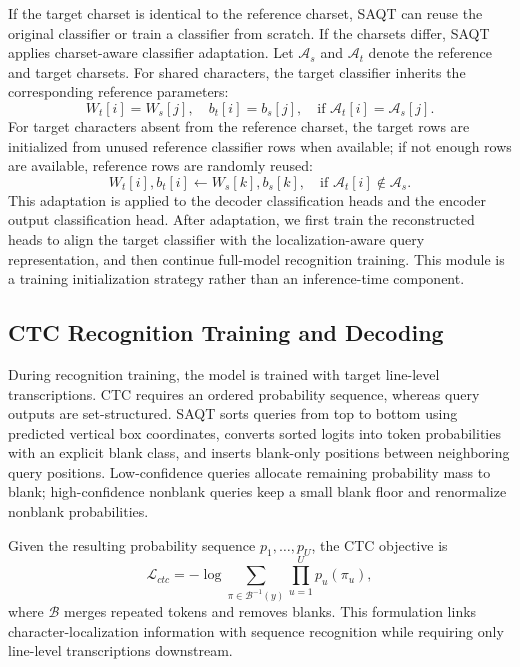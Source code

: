 If the target charset is identical to the reference charset, SAQT can reuse the original classifier or train a classifier from scratch. If the charsets differ, SAQT applies charset-aware classifier adaptation. Let $\mathcal{A}_s$ and $\mathcal{A}_t$ denote the reference and target charsets. For shared characters, the target classifier inherits the corresponding reference parameters:
\begin{equation}
W_t[i]=W_s[j],\quad b_t[i]=b_s[j],
\quad \text{if } \mathcal{A}_t[i]=\mathcal{A}_s[j].
\end{equation}
For target characters absent from the reference charset, the target rows are initialized from unused reference classifier rows when available; if not enough rows are available, reference rows are randomly reused:
\begin{equation}
W_t[i], b_t[i]\leftarrow W_s[k], b_s[k],
\quad \text{if } \mathcal{A}_t[i]\notin\mathcal{A}_s.
\end{equation}
This adaptation is applied to the decoder classification heads and the encoder output classification head. After adaptation, we first train the reconstructed heads to align the target classifier with the localization-aware query representation, and then continue full-model recognition training. This module is a training initialization strategy rather than an inference-time component.

\subsection{CTC Recognition Training and Decoding}

During recognition training, the model is trained with target line-level transcriptions. CTC requires an ordered probability sequence, whereas query outputs are set-structured. SAQT sorts queries from top to bottom using predicted vertical box coordinates, converts sorted logits into token probabilities with an explicit blank class, and inserts blank-only positions between neighboring query positions. Low-confidence queries allocate remaining probability mass to blank; high-confidence nonblank queries keep a small blank floor and renormalize nonblank probabilities.

Given the resulting probability sequence $p_1,\ldots,p_U$, the CTC objective is
\begin{equation}
\mathcal{L}_{ctc}=
-\log
\sum_{\pi\in\mathcal{B}^{-1}(y)}
\prod_{u=1}^{U}p_u(\pi_u),
\end{equation}
where $\mathcal{B}$ merges repeated tokens and removes blanks. This formulation links character-localization information with sequence recognition while requiring only line-level transcriptions downstream.

